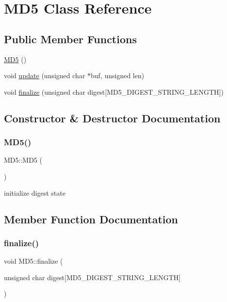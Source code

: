 \hypertarget{class_m_d5}{}\section{M\+D5 Class Reference}
\label{class_m_d5}
\subsection*{Public Member Functions}
\begin{DoxyCompactItemize}
\item 
\hyperlink{class_m_d5_afa6155ec36de415ab2dcf5e54b670d13}{M\+D5} ()
\item 
void \hyperlink{class_m_d5_a52c7dbe8d4a57e8c79d4c905205e24d0}{update} (unsigned char $\ast$buf, unsigned len)
\item 
void \hyperlink{class_m_d5_a16e5a96e255621d00ff682284cd7b69c}{finalize} (unsigned char digest\mbox{[}M\+D5\+\_\+\+D\+I\+G\+E\+S\+T\+\_\+\+S\+T\+R\+I\+N\+G\+\_\+\+L\+E\+N\+G\+TH\mbox{]})
\end{DoxyCompactItemize}


\subsection{Constructor \& Destructor Documentation}
\mbox{\label{class_m_d5_afa6155ec36de415ab2dcf5e54b670d13}} 
\subsubsection{\texorpdfstring{M\+D5()}{MD5()}}
{\footnotesize\ttfamily M\+D5\+::\+M\+D5 (\begin{DoxyParamCaption}{ }\end{DoxyParamCaption})\hspace{0.3cm}{\ttfamily [inline]}}

initialize digest state 

\subsection{Member Function Documentation}
\mbox{\label{class_m_d5_a16e5a96e255621d00ff682284cd7b69c}} 
\subsubsection{\texorpdfstring{finalize()}{finalize()}}
{\footnotesize\ttfamily void M\+D5\+::finalize (\begin{DoxyParamCaption}\item[{unsigned char}]{digest\mbox{[}\+M\+D5\+\_\+\+D\+I\+G\+E\+S\+T\+\_\+\+S\+T\+R\+I\+N\+G\+\_\+\+L\+E\+N\+G\+T\+H\mbox{]} }\end{DoxyParamCaption})\hspace{0.3cm}{\ttfamily [inline]}}

